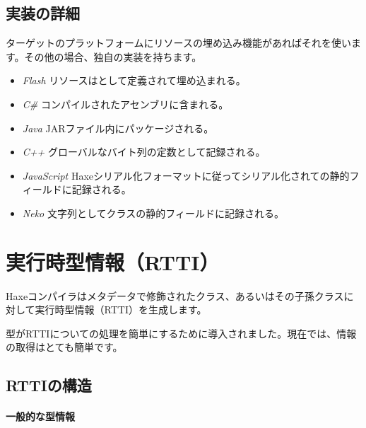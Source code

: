 \subsection{実装の詳細}
\label{cr-resources-impl}

ターゲットのプラットフォームにリソースの埋め込み機能があればそれを使います。その他の場合、独自の実装を持ちます。

\begin{itemize}
\item \emph{Flash} リソースはとして定義されて埋め込まれる。
\item \emph{C\#} コンパイルされたアセンブリに含まれる。
\item \emph{Java} JARファイル内にパッケージされる。
\item \emph{C++} グローバルなバイト列の定数として記録される。
\item \emph{JavaScript} Haxeシリアル化フォーマットに従ってシリアル化されての静的フィールドに記録される。
\item \emph{Neko} 文字列としてクラスの静的フィールドに記録される。
\end{itemize}


\section{実行時型情報（RTTI）}
\label{cr-rtti}

Haxeコンパイラはメタデータで修飾されたクラス、あるいはその子孫クラスに対して実行時型情報（RTTI）を生成します。


型がRTTIについての処理を簡単にするために導入されました。現在では、情報の取得はとても簡単です。


\subsection{RTTIの構造}
\label{cr-rtti-structure}

\paragraph{一般的な型情報}

